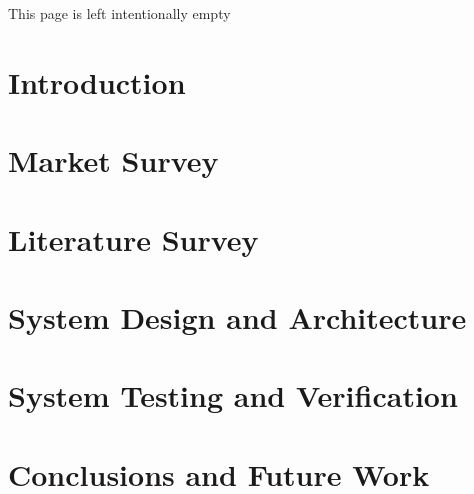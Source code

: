\documentclass[a4paper,12pt]{report}
\begin{document}
\newpage

\clearpage
\vspace*{\fill}
\begin{center}
\begin{minipage}{.45\textwidth}
This page is left intentionally empty
\end{minipage}
\end{center}
\vfill %
\thispagestyle{empty}
\clearpage




\chapter{Introduction}
\label{ch:1}


\chapter{Market Survey}
\label{ch:2}


\chapter{Literature Survey}
\label{ch:3}


\chapter{System Design and Architecture}
\label{ch:4}


\chapter{System Testing and Verification}
\label{ch:5}


\chapter{Conclusions and Future Work}
\label{ch:6}




\newpage











\end{document}

